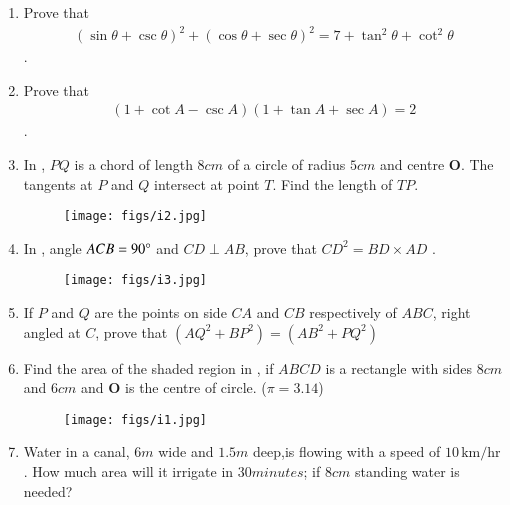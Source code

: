 \documentclass[12pt,-letter paper]{article}
\let\vec\mathbf{}
\let\vec\mathbf{}
\let\vec\mathbf{}
\providecommand{\brak}[1]{\ensuremath{\left(#1\right)}}\graphicspath{{/storage/self/primary/Download/latexnew/fig}}
\begin{document}
\begin{enumerate}
\item Prove that \begin{align*} \brak{\sin\theta + \csc\theta}^2 + \brak{\cos\theta + \sec\theta}^2 = 7 + \tan^2\theta + \cot^2\theta\end{align*}.
\item Prove that \begin{align*}\brak{1+\cot A - \csc A} \brak{1 + \tan A +\sec A} = 2 \end{align*}.
\item In , $PQ$ is a chord of length $8 cm$ of a circle of radius $5 cm$ and centre $\vec{O}$. The tangents at $P$ and $Q$ intersect at point $T$. Find the length of $TP$.
\begin{figure}[H]                                             \centering
         \texttt{[image: figs/i2.jpg]}
			\caption{}
			\label{fig:figure2}

                \end{figure}
\item In , angle $ACB = 90\degree$  and $CD \perp AB$, prove that $CD ^ 2 = BD\times AD$ .
\begin{figure}[H]                                                            \centering
                        \texttt{[image: figs/i3.jpg]}
			\caption{}
			\label{fig:figure3}
                \end{figure}
\item If $P$ and $Q$ are the points on side $CA$ and $CB$ respectively of  $ABC$, right angled at $C$, prove that $\brak{AQ^2 + BP^2} = \brak{AB^2 +PQ^2}$
\item Find the area of the shaded region in , if $ABCD$ is a rectangle with sides $8 cm$ and $6 cm$ and $\vec{O}$ is the centre of circle. ($\pi = 3.14$)
	\begin{figure}[H]                                     \centering
	\texttt{[image: figs/i1.jpg]}
		\caption{}
		\label{fig:figure4}

                \end{figure}

\item Water in a canal, $6 m$ wide and $1.5 m$ deep,is flowing with a speed of $10 \,\text{km/hr}$. How much area will it irrigate in $30 minutes$; if $8 cm$ standing water is needed?



\end{enumerate}
\end{document}
